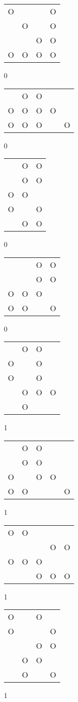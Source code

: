 \begin{tabular}{|m{0.2cm}m{0.2cm}m{0.2cm}m{0.2cm}|}\hline
O& & &O\\
 &O& &O\\
 & &O&O\\
O&O&O&O\\
\hline\end{tabular}0
\begin{tabular}{|m{0.2cm}m{0.2cm}m{0.2cm}m{0.2cm}m{0.2cm}|}\hline
 &O&O& & \\
O&O&O&O& \\
O&O&O& &O\\
\hline\end{tabular}0
\begin{tabular}{|m{0.2cm}m{0.2cm}m{0.2cm}|}\hline
 &O&O\\
 &O&O\\
O&O& \\
O& &O\\
 &O&O\\
\hline\end{tabular}0
\begin{tabular}{|m{0.2cm}m{0.2cm}m{0.2cm}m{0.2cm}|}\hline
 & &O&O\\
 & &O&O\\
O&O&O& \\
O&O& &O\\
\hline\end{tabular}0
\begin{tabular}{|m{0.2cm}m{0.2cm}m{0.2cm}m{0.2cm}|}\hline
 &O&O& \\
O& &O& \\
O& &O& \\
 &O&O&O\\
 &O& & \\
\hline\end{tabular}1
\begin{tabular}{|m{0.2cm}m{0.2cm}m{0.2cm}m{0.2cm}m{0.2cm}|}\hline
 &O&O& & \\
 &O&O& & \\
O& &O&O& \\
O&O& & &O\\
\hline\end{tabular}1
\begin{tabular}{|m{0.2cm}m{0.2cm}m{0.2cm}m{0.2cm}m{0.2cm}|}\hline
O&O& & & \\
 & & &O&O\\
O&O&O& & \\
 & &O&O&O\\
\hline\end{tabular}1
\begin{tabular}{|m{0.2cm}m{0.2cm}m{0.2cm}m{0.2cm}|}\hline
O& &O& \\
O& & &O\\
 & &O&O\\
 &O&O& \\
 &O& &O\\
\hline\end{tabular}1
